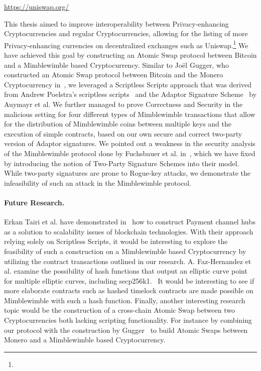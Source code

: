\urldef{\urluniswp}\url{https://uniswap.org/}

This thesis aimed to improve interoperability between Privacy-enhancing Cryptocurrencies and regular Cryptocurrencies, allowing for the listing of more Privacy-enhancing currencies on decentralized exchanges such as Uniswap.\footnote{\urluniswp}
We have achieved this goal by constructing an Atomic Swap protocol between Bitcoin and a Mimblewimble based Cryptocurrency.
Similar to Joël Gugger, who constructed an Atomic Swap protocol between Bitcoin and the Monero Cryptocurrency in~\cite{gugger2020bitcoin}, we leveraged a Scriptless Scripts approach that was derived from Andrew Poelstra's scriptless scripts~\cite{poelstra2017scriptless} and the Adaptor Signature Scheme~\cite{aumayr2020bitcoinchannels} by Auymayr et al.
We further managed to prove Correctness and Security in the malicious setting for four different types of Mimblewimble transactions that allow for the distribution of Mimblewimble coins between multiple keys and the execution of simple contracts, based on our own secure and correct two-party version of Adaptor signatures.
We pointed out a weakness in the security analysis of the Mimblewimble protocol done by Fuchsbauer et al. in~\cite{fuchsbauer2019aggregate}, which we have fixed by introducing the notion of Two-Party Signature Schemes into their model.
While two-party signatures are prone to Rogue-key attacks, we demonstrate the infeasibility of such an attack in the Mimblewimble protocol.

\paragraph{Future Research.} Erkan Tairi et al. have demonstrated in~\cite{tairi2019a2l} how to construct Payment channel hubs as a solution to scalability issues of blockchain technologies.
With their approach relying solely on Scriptless Scripts, it would be interesting to explore the feasibility of such a construction on a Mimblewimble based Cryptocurrency by utilizing the contract transactions outlined in our research.
A. Faz-Hernandez et al. examine the possibility of hash functions that output an elliptic curve point for multiple elliptic curves, including secp256k1.~\cite{hernandez2020hashing} It would be interesting to see if more elaborate contracts such as hashed timelock contracts are made possible on Mimblewimble with such a hash function.
Finally, another interesting research topic would be the construction of a cross-chain Atomic Swap between two Cryptocurrencies both lacking scripting functionality.
For instance by combining our protocol with the construction by Gugger~\cite{gugger2020bitcoin} to build Atomic Swaps between Monero and a Mimblewimble based Cryptocurrency.


